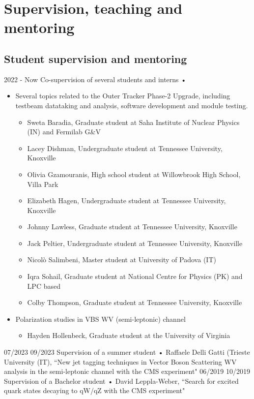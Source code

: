 \section{Supervision, teaching and mentoring}

\subsection{Student supervision and mentoring}
   \teaching
    {2022 - Now}
    {Co-supervision of several students and interns • }{
    \begin{itemize}
    \item Several topics related to the  Outer Tracker Phase-2 Upgrade, including testbeam datataking and analysis, software development and module testing.
    \begin{itemize}
    \item Sweta Baradia, Graduate student at Saha Institute of Nuclear Physics (IN) and Fermilab G\&V
    \item Lacey Dishman, Undergraduate student at Tennessee University, Knoxville 
    \item Olivia Gzamouranis, High school student at Willowbrook High School, Villa Park
    \item Elizabeth Hagen, Undergraduate student at Tennessee University, Knoxville 
    \item Johnny Lawless, Graduate student at Tennessee University, Knoxville 
    \item Jack Peltier, Undergraduate student at Tennessee University, Knoxville  
    \item Nicol\`{o} Salimbeni, Master student at University of Padova (IT)
    \item Iqra Sohail, Graduate student at National Centre for Physics (PK) and LPC based
    \item Colby Thompson, Graduate student at Tennessee University, Knoxville 
    \end{itemize}
	\item Polarization studies in VBS WV (semi-leptonic) channel
	\begin{itemize}
	\item Hayden Hollenbeck, Graduate student at the University of Virginia
	\end{itemize}






    \end{itemize}
    }
  \teaching
    {07/2023 \textemdash{} 09/2023}
    {Supervision of a summer student • }{Raffaele Delli Gatti (Trieste University (IT), ``New jet tagging techniques in Vector Boson Scattering WV analysis in the semi-leptonic channel with the CMS experiment"}
  \teaching
    {06/2019 \textemdash{} 10/2019}
    {Supervision of a Bachelor student • }{David Leppla-Weber, ``Search for excited quark states decaying to qW/qZ with the CMS experiment"}
      
